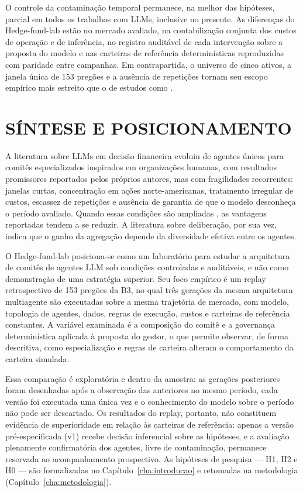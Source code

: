 \documentclass{eic-bcc-tcc}
\begin{document}
O controle da contaminação temporal permanece, na melhor das hipóteses, parcial em todos os trabalhos com LLMs, inclusive no presente. As diferenças do Hedge-fund-lab estão no mercado avaliado, na contabilização conjunta dos custos de operação e de inferência, no registro auditável de cada intervenção sobre a proposta do modelo e nas carteiras de referência determinísticas reproduzidas com paridade entre campanhas. Em contrapartida, o universo de cinco ativos, a janela única de 153 pregões e a ausência de repetições tornam seu escopo empírico mais estreito que o de estudos como \citet{FINSABER2026}.

\section{SÍNTESE E POSICIONAMENTO}

A literatura sobre LLMs em decisão financeira evoluiu de agentes únicos para comitês especializados inspirados em organizações humanas, com resultados promissores reportados pelos próprios autores, mas com fragilidades recorrentes: janelas curtas, concentração em ações norte-americanas, tratamento irregular de custos, escassez de repetições e ausência de garantia de que o modelo desconheça o período avaliado. Quando essas condições são ampliadas \citep{FINSABER2026}, as vantagens reportadas tendem a se reduzir. A literatura sobre deliberação, por sua vez, indica que o ganho da agregação depende da diversidade efetiva entre os agentes.

O Hedge-fund-lab posiciona-se como um laboratório para estudar a arquitetura de comitês de agentes LLM sob condições controladas e auditáveis, e não como demonstração de uma estratégia superior. Seu foco empírico é um replay retrospectivo de 153 pregões da B3, no qual três gerações da mesma arquitetura multiagente são executadas sobre a mesma trajetória de mercado, com modelo, topologia de agentes, dados, regras de execução, custos e carteiras de referência constantes. A variável examinada é a composição do comitê e a governança determinística aplicada à proposta do gestor, o que permite observar, de forma descritiva, como especialização e regras de carteira alteram o comportamento da carteira simulada.

Essa comparação é exploratória e dentro da amostra: as gerações posteriores foram desenhadas após a observação das anteriores no mesmo período, cada versão foi executada uma única vez e o conhecimento do modelo sobre o período não pode ser descartado. Os resultados do replay, portanto, não constituem evidência de superioridade em relação às carteiras de referência: apenas a versão pré-especificada (v1) recebe decisão inferencial sobre as hipóteses, e a avaliação plenamente confirmatória dos agentes, livre de contaminação, permanece reservada ao acompanhamento prospectivo. As hipóteses de pesquisa --- H1, H2 e H0 --- são formalizadas no Capítulo~\ref{cha:introducao} e retomadas na metodologia (Capítulo~\ref{cha:metodologia}).
\end{document}
